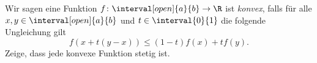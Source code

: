 \begin{exercise}
  Wir sagen eine Funktion $f \colon \interval[open]{a}{b} \to \R$ ist
  \emph{konvex}, falls für alle $x, y \in \interval[open]{a}{b}$ und
  $t \in \interval{0}{1}$ die folgende Ungleichung gilt
  \begin{equation*}
    f(x + t(y - x))
    \leq
    (1 - t)f(x) + tf(y).
  \end{equation*}
  Zeige, dass jede konvexe Funktion stetig ist.
\end{exercise}
